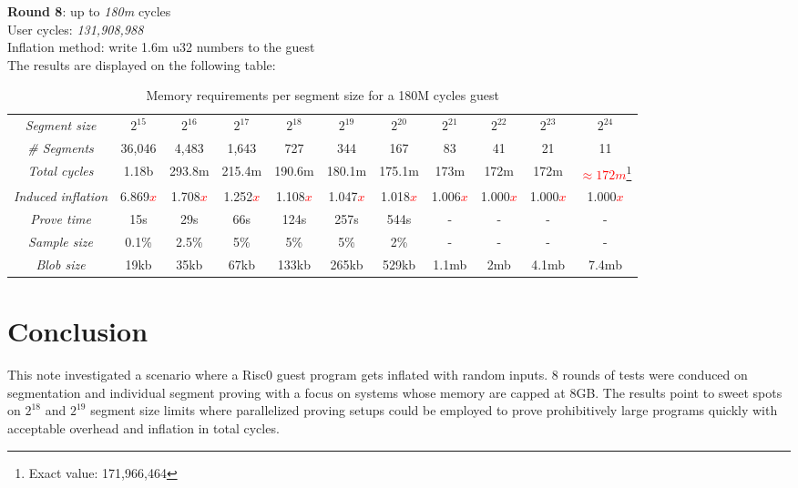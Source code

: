 \documentclass[a4paper, 10pt]{article}
\begin{document}
\par \noindent
\textbf{Round 8}: up to \textit{180m} cycles\\
User cycles: \textit{131,908,988}\\
Inflation method: write 1.6m u32 numbers to the guest\\
The results are displayed on the following table: 
\begin{table}[H]
  	\begin{center}
    \label{tab:table9}
    \begin{minipage}{\textwidth}
    \begin{adjustbox}{width=\textwidth}
    \begin{tabular}{c|c|c|c|c|c|c|c|c|c|c}
	  \textit{Segment size} & $2^{15}$ & $2^{16}$ & $2^{17}$ & $2^{18}$ & $2^{19}$ & $2^{20}$ & $2^{21}$ & $2^{22}$ & $2^{23}$ & $2^{24}$\\
	  \textit{\# Segments} & 36,046 & 4,483 & 1,643 & 727 & 344 & 167 & 83 & 41 & 21 & 11\\
	  \textit{Total cycles} & 1.18b & 293.8m & 215.4m & 190.6m & 180.1m & 175.1m & 173m & 172m & 172m & \textcolor{red}{$\approx 172m$}\footnote{Exact value: 171,966,464}\\
	  \textit{Induced inflation} & 6.869\textcolor{red}{$x$} & 1.708\textcolor{red}{$x$} & 1.252\textcolor{red}{$x$} & 1.108\textcolor{red}{$x$} & 1.047\textcolor{red}{$x$} & 1.018\textcolor{red}{$x$} & 1.006\textcolor{red}{$x$} & 1.000\textcolor{red}{$x$} & 1.000\textcolor{red}{$x$} & 1.000\textcolor{red}{$x$}\\
	  \textit{Prove time} & 15s & 29s & 66s & 124s & 257s & 544s & - & - & - & -\\
	  \textit{Sample size} & 0.1\% & 2.5\% & 5\% & 5\% & 5\% & 2\% & - & - & - & -\\
	  \textit{Blob size} & 19kb & 35kb & 67kb & 133kb & 265kb & 529kb & 1.1mb & 2mb & 4.1mb & 7.4mb\\
   	\end{tabular}
   	\end{adjustbox}
   	\end{minipage}
    \caption{Memory requirements per segment size for a 180M cycles guest}
  \end{center}
\end{table}

\section*{Conclusion}
This note investigated a scenario where a Risc0 guest program gets inflated with random inputs. 8 rounds of tests were conduced on segmentation and individual segment proving with a focus on systems whose memory are capped at 8GB. The results point to sweet spots on $2^{18}$ and $2^{19}$ segment size limits where parallelized proving setups could be employed to prove prohibitively large programs quickly with acceptable overhead and inflation in total cycles.
\end{document}
